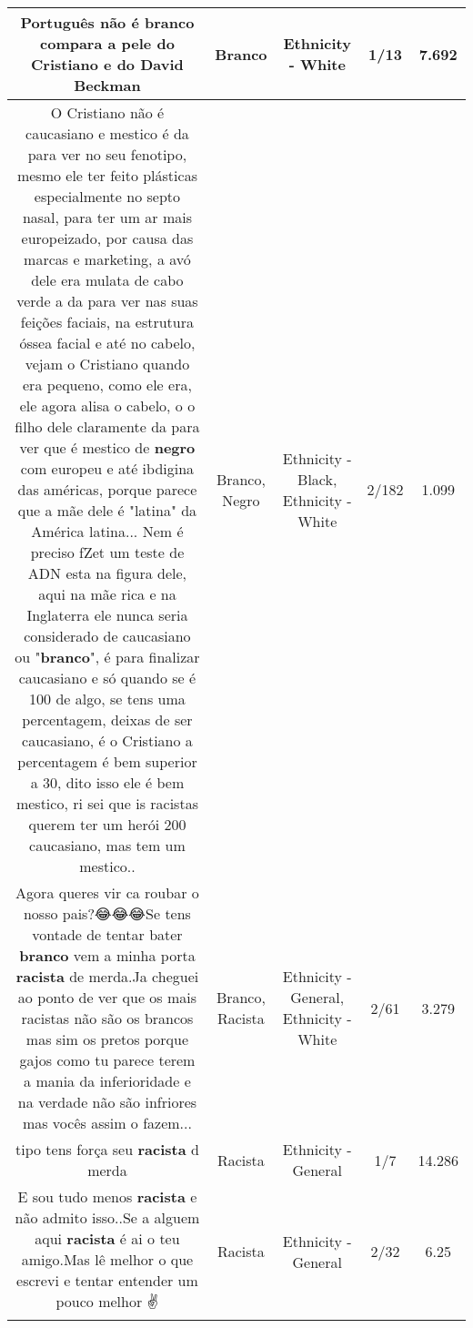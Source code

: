 \documentclass[11pt]{article}
\newlength\mylength
\begin{document}
\begin{center}
\begin{longtable}{|C{.65\mylength}|C{.30\mylength}|C{.12\mylength}|C{.12\mylength}|C{.12\mylength}|}
  \small Português não é \textbf{branco} compara a pele do Cristiano e do David Beckman\normalsize   & Branco & Ethnicity - White & 1/13 & 7.692 \\  \hline
  \small O Cristiano não é caucasiano e mestico é da para ver no seu fenotipo, mesmo ele ter feito plásticas especialmente no septo nasal, para ter um ar mais europeizado, por causa das marcas e marketing, a avó dele era mulata de cabo verde a da para ver nas suas feições faciais, na estrutura óssea facial e até no cabelo, vejam o Cristiano quando era pequeno, como ele era, ele agora alisa o cabelo, o o filho dele claramente da para ver que é mestico de \textbf{negro} com europeu e até ibdigina das américas, porque parece que a mãe dele é "latina" da América latina... Nem é preciso fZet um teste de ADN esta na figura dele, aqui na mãe rica e na Inglaterra ele nunca seria considerado de caucasiano ou "\textbf{branco}", é para finalizar caucasiano e só quando se é 100 de algo, se tens uma percentagem, deixas de ser caucasiano, é o Cristiano a percentagem é bem superior a 30, dito isso ele é bem mestico, ri sei que is racistas querem ter um herói 200 caucasiano, mas tem um mestico..\normalsize   & Branco, Negro & Ethnicity - Black, Ethnicity - White & 2/182 & 1.099 \\  \hline
  \small Agora queres vir ca roubar o nosso pais?😂😂😂Se tens vontade de tentar bater \textbf{branco} vem a minha porta \textbf{racista} de merda.Ja cheguei ao ponto de ver que os mais racistas não são os brancos mas sim os pretos porque gajos como tu parece terem a mania da inferioridade e na verdade não são infriores mas vocês assim o fazem...\normalsize   & Branco, Racista & Ethnicity - General, Ethnicity - White & 2/61 & 3.279 \\  \hline
  \small tipo tens força seu \textbf{racista} d merda\normalsize   & Racista & Ethnicity - General & 1/7 & 14.286 \\  \hline
  \small E sou tudo menos \textbf{racista} e não admito isso..Se a alguem aqui \textbf{racista} é ai o teu amigo.Mas lê melhor o que escrevi e tentar entender um pouco melhor ✌\normalsize   & Racista & Ethnicity - General & 2/32 & 6.25 \\  \hline

\end{longtable}
\end{center}
\end{document}
